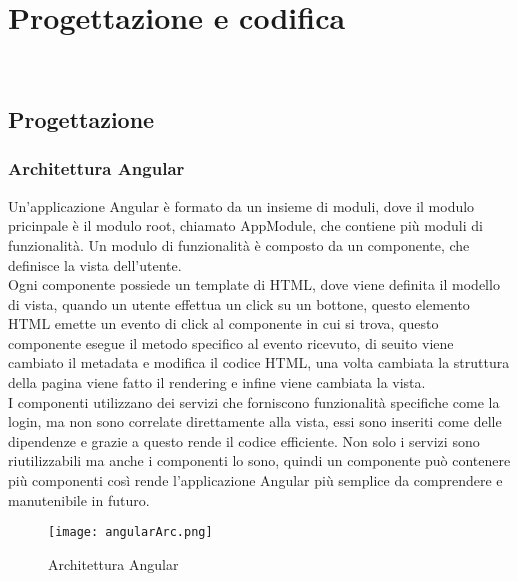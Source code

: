 
\chapter{Progettazione e codifica}
\label{cap:progettazione e codifica}

\\

\section{Progettazione}
\subsection{Architettura Angular}
Un'applicazione Angular è formato da un insieme di moduli, dove il modulo pricinpale è il modulo root, chiamato AppModule, che contiene più moduli di funzionalità. Un modulo di funzionalità è composto da un componente, che definisce la vista dell'utente.\\
Ogni componente possiede un template di HTML, dove viene definita il modello di vista, quando un utente effettua un click su un bottone, questo elemento HTML emette un evento di click al componente in cui si trova, questo componente esegue il metodo specifico al evento ricevuto, di seuito viene cambiato il metadata e modifica il codice HTML, una volta cambiata la struttura della pagina viene fatto il rendering e infine viene cambiata la vista.\\
I componenti utilizzano dei servizi che forniscono funzionalità specifiche come la login, ma non sono correlate direttamente alla vista, essi sono inseriti come delle dipendenze e grazie a questo rende il codice efficiente. Non solo i servizi sono riutilizzabili ma anche i componenti lo sono, quindi un componente può contenere più componenti così rende l'applicazione Angular più semplice da comprendere e manutenibile in futuro.\\
\begin{figure}[H]
    \centering
    \texttt{[image: angularArc.png]}
    \caption{Architettura Angular}
\end{figure}
